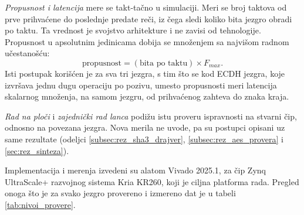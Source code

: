\textit{Propusnost i latencija} mere se takt-tačno u simulaciji. Meri se broj taktova od prve prihvaćene do poslednje predate reči, iz čega sledi koliko bita jezgro obradi po taktu. Ta vrednost je svojstvo arhitekture i ne zavisi od tehnologije. Propusnost u apsolutnim jedinicama dobija se množenjem sa najvišom radnom učestanošću:
\begin{equation}
    \text{propusnost} = (\text{bita po taktu}) \times F_{max}.
    \label{eq:metod_propusnost}
\end{equation}
Isti postupak korišćen je za sva tri jezgra, s tim što se kod ECDH jezgra, koje izvršava jednu dugu operaciju po pozivu, umesto propusnosti meri latencija skalarnog množenja, na samom jezgru, od prihvaćenog zahteva do znaka kraja.

\textit{Rad na ploči} i \textit{zajednički rad lanca} podižu istu proveru ispravnosti na stvarni čip, odnosno na povezana jezgra. Nova merila ne uvode, pa su postupci opisani uz same rezultate (odeljci \ref{subsec:rez_sha3_drajver}, \ref{subsec:rez_aes_provera} i \ref{sec:rez_sinteza}).

Implementacija i merenja izvedeni su alatom Vivado 2025.1, za čip Zynq UltraScale+ razvojnog sistema Kria KR260, koji je ciljna platforma rada.
\smallbreak
Pregled onoga što je za svako jezgro provereno i izmereno dat je u tabeli \ref{tab:nivoi_provere}.

\begin{table}[H]
\caption{Nivoi provere po jezgru}
\centering
{}
\label{tab:nivoi_provere}
\end{table}

